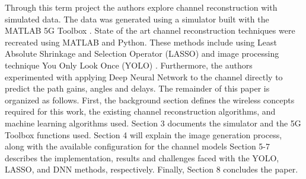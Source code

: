 Through this term project the authors explore channel reconstruction with simulated data. The data was generated using a simulator built with the MATLAB 5G Toolbox \cite{matlab2020}. State of the art channel reconstruction techniques were recreated using MATLAB and Python. These methods include using Least Absolute Shrinkage and Selection Operator (LASSO) \cite{Han2019} and image processing technique You Only Look Once (YOLO) \cite{Li2020}. Furthermore, the authors experimented with applying Deep Neural Network to the channel directly to predict the path gains, angles and delays. The remainder of this paper is organized as follows. First, the background section defines the wireless concepts required for this work, the existing channel reconstruction algorithms, and machine learning algorithms used. Section 3 documents the simulator and the 5G Toolbox functions used. Section 4 will explain the image generation process, along with the available configuration for the channel models Section 5-7 describes the implementation, results and challenges faced with the YOLO, LASSO, and DNN methods, respectively. Finally, Section 8 concludes the paper.  